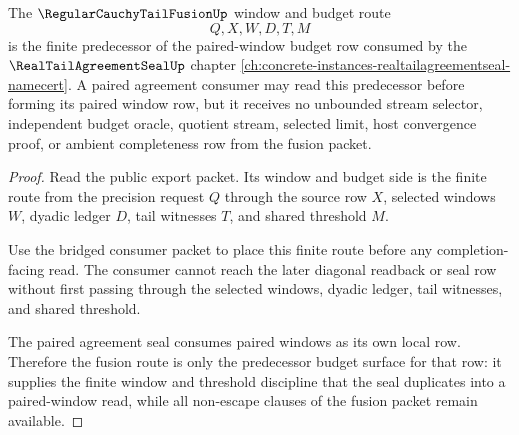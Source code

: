 \begin{theorem}
\label{thm:regular-cauchy-tail-fusion-paired-window-budget}
The $\RegularCauchyTailFusionUp$ window and budget route
$$
Q,X,W,D,T,M
$$
is the finite predecessor of the paired-window budget row consumed by the $\RealTailAgreementSealUp$ chapter \autoref{ch:concrete-instances-realtailagreementseal-namecert}. A paired agreement consumer may read this predecessor before forming its paired window row, but it receives no unbounded stream selector, independent budget oracle, quotient stream, selected limit, host convergence proof, or ambient completeness row from the fusion packet.
\end{theorem}
\begin{proof}
Read the public export packet. Its window and budget side is the finite route from the precision request $Q$ through the source row $X$, selected windows $W$, dyadic ledger $D$, tail witnesses $T$, and shared threshold $M$.

Use the bridged consumer packet to place this finite route before any completion-facing read. The consumer cannot reach the later diagonal readback or seal row without first passing through the selected windows, dyadic ledger, tail witnesses, and shared threshold.

The paired agreement seal consumes paired windows as its own local row. Therefore the fusion route is only the predecessor budget surface for that row: it supplies the finite window and threshold discipline that the seal duplicates into a paired-window read, while all non-escape clauses of the fusion packet remain available.
\end{proof}

